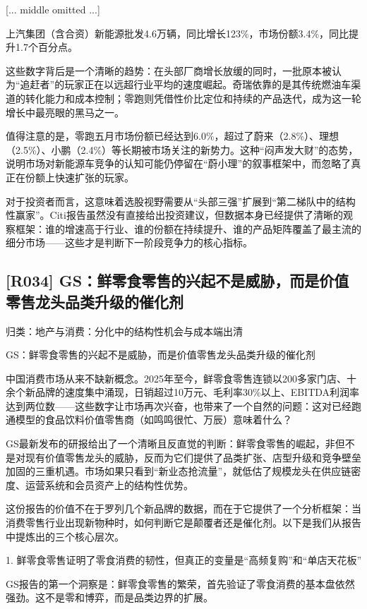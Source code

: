 \documentclass[11pt]{ctexart}
\begin{document}
[... middle omitted ...]

上汽集团（含合资）新能源批发4.6万辆，同比增长123\%，市场份额3.4\%，同比提升1.7个百分点。

这些数字背后是一个清晰的趋势：在头部厂商增长放缓的同时，一批原本被认为“追赶者”的玩家正在以远超行业平均的速度崛起。奇瑞依靠的是其传统燃油车渠道的转化能力和成本控制；零跑则凭借性价比定位和持续的产品迭代，成为这一轮增长中最亮眼的黑马之一。

值得注意的是，零跑五月市场份额已经达到6.0\%，超过了蔚来（2.8\%）、理想（2.5\%）、小鹏（2.4\%）等长期被市场关注的新势力。这种“闷声发大财”的态势，说明市场对新能源车竞争的认知可能仍停留在“蔚小理”的叙事框架中，而忽略了真正在份额上快速扩张的玩家。

对于投资者而言，这意味着选股视野需要从“头部三强”扩展到“第二梯队中的结构性赢家”。Citi报告虽然没有直接给出投资建议，但数据本身已经提供了清晰的观察框架：谁的增速高于行业、谁的份额在持续提升、谁的产品矩阵覆盖了最主流的细分市场——这些才是判断下一阶段竞争力的核心指标。

\subsection{[R034] GS：鲜零食零售的兴起不是威胁，而是价值零售龙头品类升级的催化剂}
{\small\color{refgray}归类：地产与消费：分化中的结构性机会与成本端出清}

GS：鲜零食零售的兴起不是威胁，而是价值零售龙头品类升级的催化剂

中国消费市场从来不缺新概念。2025年至今，鲜零食零售连锁以200多家门店、十余个新品牌的速度集中涌现，日销超过10万元、毛利率30\%以上、EBITDA利润率达到两位数——这些数字让市场再次兴奋，也带来了一个自然的问题：这对已经跑通模型的食品饮料价值零售商（如鸣鸣很忙、万辰）意味着什么？

GS最新发布的研报给出了一个清晰且反直觉的判断：鲜零食零售的崛起，非但不是对现有价值零售龙头的威胁，反而为它们提供了品类扩张、店型升级和竞争壁垒加固的三重机遇。市场如果只看到“新业态抢流量”，就低估了规模龙头在供应链密度、运营系统和会员资产上的结构性优势。

这份报告的价值不在于罗列几个新品牌的数据，而在于它提供了一个分析框架：当消费零售行业出现新物种时，如何判断它是颠覆者还是催化剂。以下是我们从报告中提炼出的三个核心层次。

1. 鲜零食零售证明了零食消费的韧性，但真正的变量是“高频复购”和“单店天花板”

GS报告的第一个洞察是：鲜零食零售的繁荣，首先验证了零食消费的基本盘依然强劲。这不是零和博弈，而是品类边界的扩展。
\end{document}

